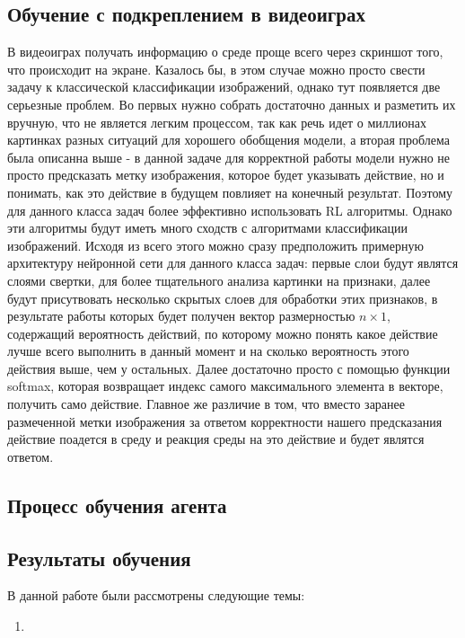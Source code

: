\documentclass[bachelor, och, coursework]{shiza}
\begin{document}
\subsection{Обучение с подкреплением в видеоиграх}
В видеоиграх получать информацию о среде проще всего через скриншот того, что происходит на экране. Казалось бы, в этом случае можно просто свести 
задачу к классической классификации изображений, однако тут появляется две серьезные проблем. Во первых нужно собрать достаточно данных и разметить
их вручную, что не является легким процессом, так как речь идет о миллионах картинках разных ситуаций для хорошего обобщения модели, а вторая проблема
была описанна выше - в данной задаче для корректной работы модели нужно не просто предсказать метку изображения, которое будет указывать действие, но
и понимать, как это действие в будущем повлияет на конечный результат. Поэтому для данного класса задач более эффективно использовать RL алгоритмы.
Однако эти алгоритмы будут иметь много сходств с алгоритмами классификации изображений. Исходя из всего этого можно сразу предположить примерную архитектуру
нейронной сети для данного класса задач: первые слои будут являтся слоями свертки, для более тщательного анализа картинки на признаки, далее будут присутвовать
несколько скрытых слоев для обработки этих признаков, в результате работы которых будет получен вектор размерностью $n \times 1$, содержащий вероятность действий,
по которому можно понять какое действие лучше всего выполнить в данный момент и на сколько вероятность этого действия выше, чем у остальных. Далее достаточно просто
с помощью функции softmax, которая возвращает индекс самого максимального элемента в векторе, получить само действие. Главное же различие в том, что вместо заранее
размеченной метки изображения за ответом корректности нашего предсказания действие поадется в среду и реакция среды на это действие и будет являтся ответом.
\subsection{Процесс обучения агента}
\subsection{Результаты обучения}

\newpage
\conclusion %

В данной работе были рассмотрены следующие темы:

\begin{enumerate}
    \item 
\end{enumerate}
\end{document}
